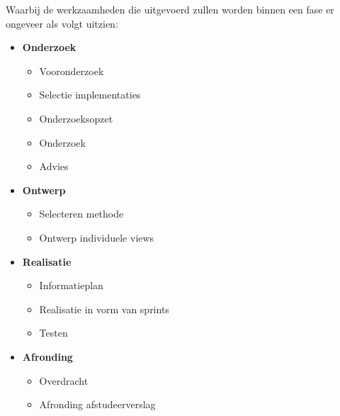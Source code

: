 Waarbij de werkzaamheden die uitgevoerd zullen worden binnen een fase er ongeveer als volgt uitzien:

\begin{multicols}{2}
  \begin{itemize}[noitemsep]
    \item \textbf{Onderzoek}
    \begin{itemize}[noitemsep]
      \item Vooronderzoek
      \item Selectie implementaties
      \item Onderzoeksopzet
      \item Onderzoek
      \item Advies
    \end{itemize}
    \item \textbf{Ontwerp}
    \begin{itemize}[noitemsep]
      \item Selecteren methode
      \item Ontwerp individuele views
    \end{itemize}
    \item \textbf{Realisatie}
    \begin{itemize}[noitemsep]
      \item Informatieplan
      \item Realisatie in vorm van sprints
      \item Testen
    \end{itemize}
    \item \textbf{Afronding}
    \begin{itemize}
      \item Overdracht
      \item Afronding afstudeerverslag
    \end{itemize}
  \end{itemize}
\end{multicols}